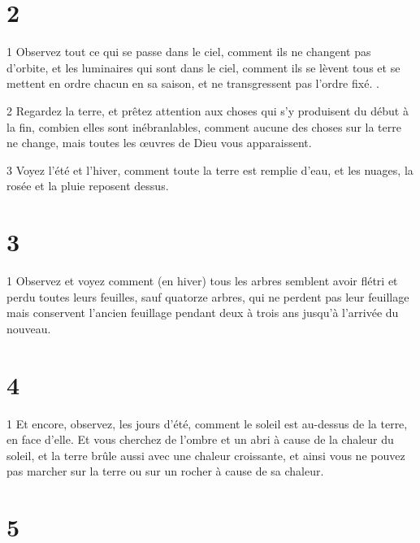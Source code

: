 \chapter{2}

\par 1 Observez tout ce qui se passe dans le ciel, comment ils ne changent pas d'orbite, et les luminaires qui sont dans le ciel, comment ils se lèvent tous et se mettent en ordre chacun en sa saison, et ne transgressent pas l'ordre fixé. .
\par 2 Regardez la terre, et prêtez attention aux choses qui s'y produisent du début à la fin, combien elles sont inébranlables, comment aucune des choses sur la terre ne change, mais toutes les œuvres de Dieu vous apparaissent.
\par 3 Voyez l'été et l'hiver, comment toute la terre est remplie d'eau, et les nuages, la rosée et la pluie reposent dessus.

\chapter{3}

\par 1 Observez et voyez comment (en hiver) tous les arbres semblent avoir flétri et perdu toutes leurs feuilles, sauf quatorze arbres, qui ne perdent pas leur feuillage mais conservent l'ancien feuillage pendant deux à trois ans jusqu'à l'arrivée du nouveau.

\chapter{4}

\par 1 Et encore, observez, les jours d'été, comment le soleil est au-dessus de la terre, en face d'elle. Et vous cherchez de l'ombre et un abri à cause de la chaleur du soleil, et la terre brûle aussi avec une chaleur croissante, et ainsi vous ne pouvez pas marcher sur la terre ou sur un rocher à cause de sa chaleur.

\chapter{5}

